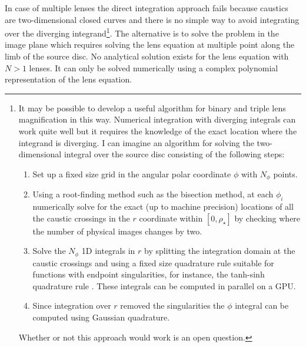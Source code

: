 \documentclass[12pt,dvipsnames]{report}
\newcommand{\ssf}[1]{\textsf{#1}}
\begin{document}
In case of multiple lenses the direct integration approach fails because caustics are 
two-dimensional closed curves and there is no simple way to avoid integrating over the 
diverging integrand\footnote{It may be possible to develop a useful algorithm for binary 
and triple lens magnification in this way. Numerical integration with diverging integrals 
can work quite well but it requires the knowledge of the exact location where the 
integrand is diverging. I can imagine an algorithm for solving the two-dimensional integral
over the source disc consisting of the following steps:
\begin{enumerate}
    \item Set up a fixed size grid in the angular polar coordinate $\phi$ with $N_\phi$
    points. 
    \item Using a root-finding method such as the bisection method, at each 
    $\phi_i$ numerically solve for the exact (up to machine precision) locations of all 
    the caustic crossings in the $r$ coordinate  within $[0,\rho_\star]$ by checking 
    where the number of physical images changes by two.
    \item Solve the $N_\phi$ 1D integrals in $r$ by splitting the integration domain at 
    the caustic crossings and using a fixed size quadrature rule suitable for functions 
    with endpoint singularities, for instance, the \ssf{tanh-sinh quadrature} rule 
    \citep{2020arXiv200715057V}. These integrals can be computed in parallel on a GPU. 
    \item Since integration over $r$ removed the singularities the $\phi$ integral can
    be computed using Gaussian quadrature.
\end{enumerate}
Whether or not this approach would work is an open question.}. The alternative is to 
solve the  problem in the image plane which requires solving the lens equation at 
multiple point  along the limb of the source disc. No analytical solution exists for 
the lens equation  with $N>1$ lenses. It can only be solved numerically using a 
complex polynomial representation of the lens equation.
\end{document}
